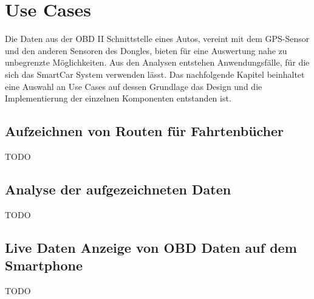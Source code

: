\chapter{Use Cases}
\label{sec:useCases}

Die Daten aus der OBD II Schnittstelle eines Autos, vereint mit dem GPS-Sensor und den anderen Sensoren des Dongles, bieten für eine Auswertung nahe zu unbegrenzte Möglichkeiten. Aus den Analysen entstehen Anwendungsfälle, für die sich das SmartCar System verwenden lässt. Das nachfolgende Kapitel beinhaltet eine Auswahl an Use Cases auf dessen Grundlage das Design und die Implementierung der einzelnen Komponenten entstanden ist.

\section{Aufzeichnen von Routen für Fahrtenbücher}
TODO
\section{Analyse der aufgezeichneten Daten}
TODO
\section{Live Daten Anzeige von OBD Daten auf dem Smartphone}
TODO
  

 
 
 
 
 
 
 
 